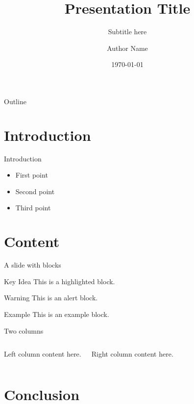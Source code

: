 

\title{Presentation Title}
\subtitle{Subtitle here}
\author{Author Name}
\date{\today}



\maketitleframe

\begin{frame}{Outline}
  \tableofcontents
\end{frame}

\section{Introduction}

\begin{frame}{Introduction}
  \begin{itemize}
    \item First point
    \item Second point
    \item Third point
  \end{itemize}
\end{frame}

\section{Content}

\begin{frame}{A slide with blocks}
  \begin{block}{Key Idea}
    This is a highlighted block.
  \end{block}

  \begin{alertblock}{Warning}
    This is an alert block.
  \end{alertblock}

  \begin{exampleblock}{Example}
    This is an example block.
  \end{exampleblock}
\end{frame}

\begin{frame}{Two columns}
  \begin{columns}
      Left column content here.

      Right column content here.
  \end{columns}
\end{frame}

\section{Conclusion}

